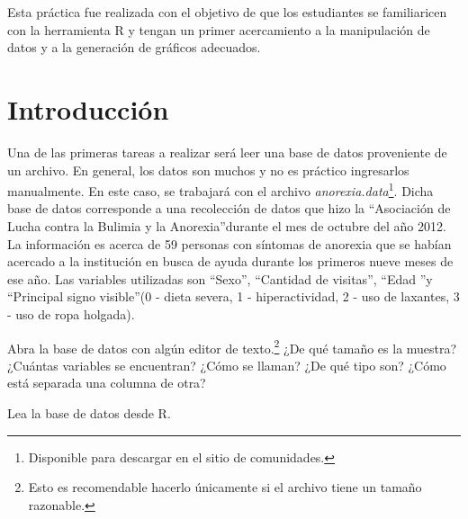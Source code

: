 \documentclass{prob}
\begin{document}
\maketitle

Esta práctica fue realizada con el objetivo de que los estudiantes se familiaricen con la herramienta R y tengan un primer acercamiento a la manipulación de datos y a la generación de gráficos adecuados.

\section*{Introducción}
    \begin{problema}
	Una de las primeras tareas a realizar será leer una base de datos proveniente de un archivo. En general, los datos son muchos y no es práctico ingresarlos manualmente. En este caso, se trabajará con el archivo \textit{anorexia.data}\footnote{Disponible para descargar en el sitio de comunidades.}. Dicha base de datos corresponde a una recolección de datos que hizo la \textquotedblleft Asociación de Lucha contra la Bulimia y la Anorexia\textquotedblright durante el mes de octubre del año 2012. La información es acerca de 59 personas con síntomas de anorexia que se habían acercado a la institución en busca de ayuda durante los primeros nueve meses de ese año. Las variables utilizadas son \textquotedblleft Sexo\textquotedblright, \textquotedblleft Cantidad de visitas\textquotedblright , \textquotedblleft Edad \textquotedblright y \textquotedblleft Principal signo visible\textquotedblright (0 - dieta severa, 1 - hiperactividad, 2 - uso de laxantes, 3 - uso de ropa holgada).
	
	\begin{parte}
    	Abra la base de datos con algún editor de texto.\footnote{Esto es recomendable hacerlo únicamente si el archivo tiene un tamaño razonable.} ¿De qué tamaño es la muestra? ¿Cuántas variables se encuentran? ¿Cómo se llaman? ¿De qué tipo son? ¿Cómo está separada una columna de otra?
    \end{parte}
 
	\begin{parte}
    	Lea la base de datos desde R. \\
		
		\noindent{}	

    \end{parte}
        	
    \end{problema}
\end{document}
